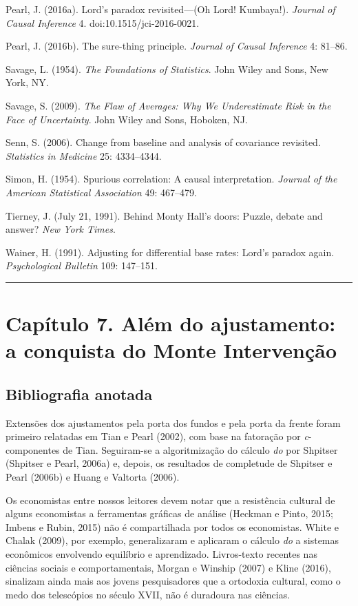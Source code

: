 \documentclass[11pt,a5paper,twoside]{book}
\begin{document}
Pearl, J. (2016a). Lord’s paradox revisited—(Oh Lord! Kumbaya!). \textit{Journal of Causal Inference} 4. doi:10.1515/jci-2016-0021.

Pearl, J. (2016b). The sure-thing principle. \textit{Journal of Causal Inference} 4: 81–86.

Savage, L. (1954). \textit{The Foundations of Statistics}. John Wiley and Sons, New York, NY.

Savage, S. (2009). \textit{The Flaw of Averages: Why We Underestimate Risk in the Face of Uncertainty}. John Wiley and Sons, Hoboken, NJ.

Senn, S. (2006). Change from baseline and analysis of covariance revisited. \textit{Statistics in Medicine} 25: 4334–4344.

Simon, H. (1954). Spurious correlation: A causal interpretation. \textit{Journal of the American Statistical Association} 49: 467–479.

Tierney, J. (July 21, 1991). Behind Monty Hall’s doors: Puzzle, debate and answer? \textit{New York Times}.

Wainer, H. (1991). Adjusting for differential base rates: Lord’s paradox again. \textit{Psychological Bulletin} 109: 147–151.

\vspace{1em}\hrule\vspace{1em}
\section{Capítulo 7. Além do ajustamento: a conquista do Monte Intervenção}
\subsection{Bibliografia anotada}
Extensões dos ajustamentos pela porta dos fundos e pela porta da frente foram primeiro relatadas em Tian e Pearl (2002), com base na fatoração por \textit{c}-componentes de Tian. Seguiram-se a algoritmização do cálculo \textit{do} por Shpitser (Shpitser e Pearl, 2006a) e, depois, os resultados de completude de Shpitser e Pearl (2006b) e Huang e Valtorta (2006).

Os economistas entre nossos leitores devem notar que a resistência cultural de alguns economistas a ferramentas gráficas de análise (Heckman e Pinto, 2015; Imbens e Rubin, 2015) não é compartilhada por todos os economistas. White e Chalak (2009), por exemplo, generalizaram e aplicaram o cálculo \textit{do} a sistemas econômicos envolvendo equilíbrio e aprendizado. Livros-texto recentes nas ciências sociais e comportamentais, Morgan e Winship (2007) e Kline (2016), sinalizam ainda mais aos jovens pesquisadores que a ortodoxia cultural, como o medo dos telescópios no século XVII, não é duradoura nas ciências.
\end{document}
